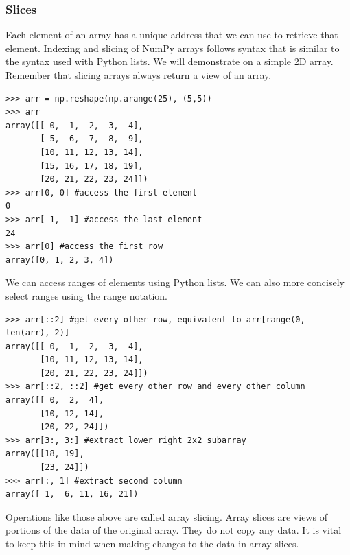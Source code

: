 \subsubsection*{Slices}
Each element of an array has a unique address that we can use to retrieve that element.
Indexing and slicing of NumPy arrays follows syntax that is similar to the syntax used 
with Python lists.
We will demonstrate on a simple 2D array.
Remember that slicing arrays always return a view of an array.
\begin{lstlisting}
>>> arr = np.reshape(np.arange(25), (5,5))
>>> arr
array([[ 0,  1,  2,  3,  4],
       [ 5,  6,  7,  8,  9],
       [10, 11, 12, 13, 14],
       [15, 16, 17, 18, 19],
       [20, 21, 22, 23, 24]])
>>> arr[0, 0] #access the first element
0
>>> arr[-1, -1] #access the last element
24
>>> arr[0] #access the first row
array([0, 1, 2, 3, 4])
\end{lstlisting}
We can access ranges of elements using Python lists.
We can also more concisely select ranges using the  range notation.
\begin{lstlisting}
>>> arr[::2] #get every other row, equivalent to arr[range(0, len(arr), 2)]
array([[ 0,  1,  2,  3,  4],
       [10, 11, 12, 13, 14],
       [20, 21, 22, 23, 24]])
>>> arr[::2, ::2] #get every other row and every other column
array([[ 0,  2,  4],
       [10, 12, 14],
       [20, 22, 24]])
>>> arr[3:, 3:] #extract lower right 2x2 subarray
array([[18, 19],
       [23, 24]])
>>> arr[:, 1] #extract second column
array([ 1,  6, 11, 16, 21])
\end{lstlisting}
Operations like those above are called array slicing.
Array slices are views of portions of the data of the original array.
They do not copy any data. It is vital to keep this in mind when making changes 
to the data in array slices.

